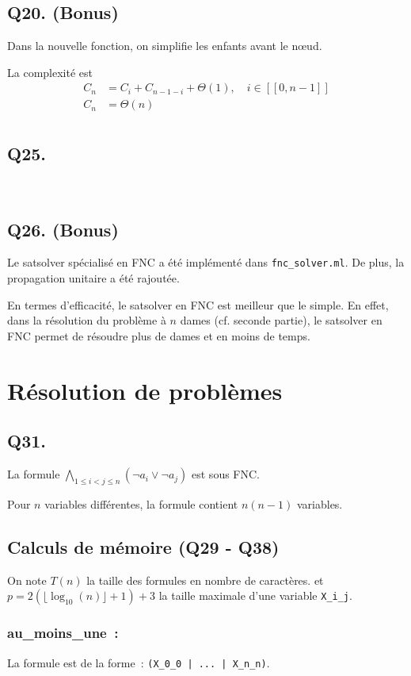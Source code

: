 \subsection*{Q20. (Bonus)}
Dans la nouvelle fonction, on simplifie les enfants avant le nœud.

La complexité est
\begin{align*}
    C_n &= C_{i} + C_{n-1-i} + \Theta(1), \quad i \in [\![0,n-1]\!]\\
    C_n &= \boxed{\Theta(n)}\\
\end{align*}

\subsection*{Q25.}~

\subsection*{Q26. (Bonus)}
Le satsolver spécialisé en FNC a été implémenté dans \verb|fnc_solver.ml|.
De plus, la propagation unitaire a été rajoutée.

En termes d'efficacité, le satsolver en FNC est meilleur que le simple.
En effet, dans la résolution du problème à $n$ dames (cf. seconde partie),
le satsolver en FNC permet de résoudre plus de dames et en moins de temps.

\section{Résolution de problèmes}
\subsection*{Q31.}
La formule
$\boxed{\bigwedge\limits_{1 \leq i < j \leq n}\left(\lnot a_i \lor \lnot a_j\right)}$
est sous FNC.

Pour $n$ variables différentes, la formule contient $n(n-1)$ variables.

\subsection*{Calculs de mémoire (Q29 - Q38)}

On note $T(n)$ la taille des formules en nombre de caractères.
et $p = 2(\lfloor \log_{10}(n)\rfloor + 1) + 3$ la taille maximale d'une
variable \verb|X_i_j|.

\subsubsection*{au\_moins\_une~:}
La formule est de la forme~: \verb$(X_0_0 | ... | X_n_n)$.


